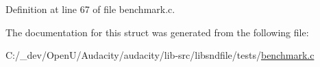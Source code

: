 Definition at line 67 of file benchmark.\+c.



The documentation for this struct was generated from the following file\+:\begin{DoxyCompactItemize}
\item 
C\+:/\+\_\+dev/\+Open\+U/\+Audacity/audacity/lib-\/src/libsndfile/tests/\hyperlink{libsndfile_2tests_2benchmark_8c}{benchmark.\+c}\end{DoxyCompactItemize}
